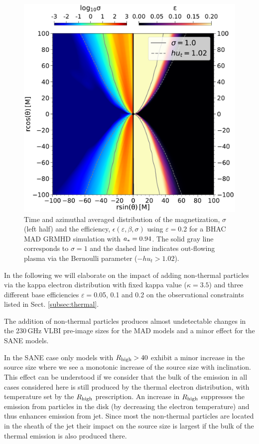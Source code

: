 \begin{figure}
  \centering
    \includegraphics[width=\columnwidth]{./figures/GRMHDphiavera0.94sigmaeta.pdf}
  \caption{Time and azimuthal averaged distribution of the magnetization, $\sigma$ (left half) and the efficiency, $\epsilon(\varepsilon,\beta,\sigma)$ using $\varepsilon=0.2 $ for a BHAC MAD GRMHD simulation with $a_*=0.94$. The solid gray line corresponds to $\sigma=1$ and the dashed line indicates out-flowing plasma via the Bernoulli parameter ($-h u_{t}>1.02$).}
  \label{fig:varepsilon}
\end{figure}

In the following we will elaborate on the impact of adding non-thermal particles via the kappa electron distribution with fixed kappa value ($\kappa=3.5$) and three different base efficiencies $\varepsilon=$0.05, 0.1 and 0.2 on the observational constraints listed in Sect. \ref{subsec:thermal}.


The addition of non-thermal particles produces almost undetectable changes in the 230\,GHz VLBI pre-image sizes for the MAD models and a minor effect for the SANE models. 

In the SANE case only models with $R_\mathrm{high}>40$ exhibit a minor increase in the source size where we see a monotonic increase of the source size with inclination. This effect can be understood if we consider that the bulk of the emission in all cases considered here is still produced by the thermal electron distribution, with temperature set by the $R_\mathrm{high}$ prescription.  An increase in $R_\mathrm{high}$ suppresses the emission from particles in the disk (by decreasing the electron temperature) and thus enhances emission from jet.  Since most the non-thermal particles are located in the sheath of the jet their impact on the source size is largest if the bulk of the thermal emission is also produced there. 

